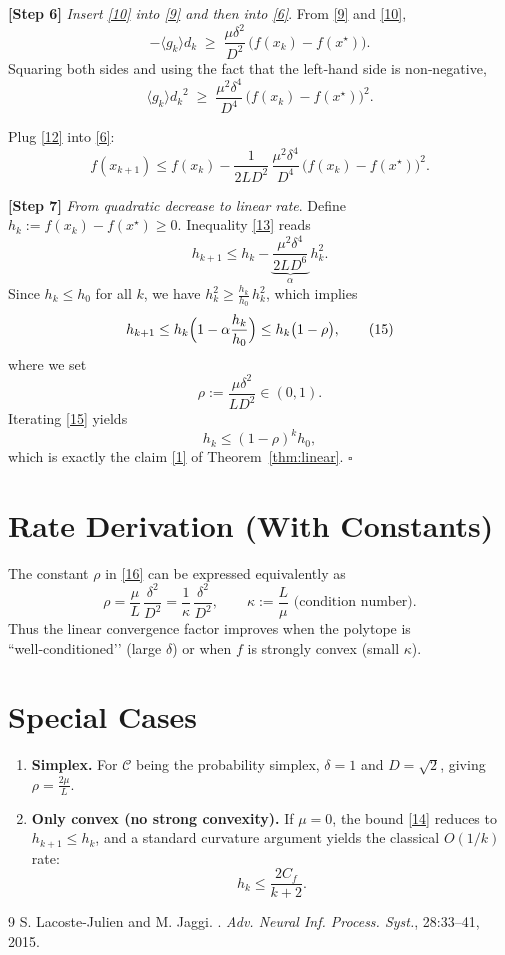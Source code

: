 \documentclass{article}
\newcommand{\Cset}{\mathcal{C}}
\newcommand{\inner}[1]{\langle #1\rangle}
\begin{document}
\noindent\textbf{[Step 6]} \emph{Insert \eqref{10} into \eqref{9} and then into \eqref{6}}.  
From \eqref{9} and \eqref{10},
\[
-\inner{g_{k}}{d_{k}}\;\ge\;
\frac{\mu\delta^{2}}{D^{2}}\,
\bigl(f(x_{k})-f(x^{\star})\bigr).
\tag{11}
\]
Squaring both sides and using the fact that the left‑hand side is non‑negative,
\[
\inner{g_{k}}{d_{k}}^{2}
\;\ge\;
\frac{\mu^{2}\delta^{4}}{D^{4}}\,
\bigl(f(x_{k})-f(x^{\star})\bigr)^{2}.
\tag{12}
\]

Plug \eqref{12} into \eqref{6}:
\[
f(x_{k+1})
\le f(x_{k})
-\frac{1}{2L D^{2}}\,
\frac{\mu^{2}\delta^{4}}{D^{4}}\,
\bigl(f(x_{k})-f(x^{\star})\bigr)^{2}.
\tag{13}
\]

\noindent\textbf{[Step 7]} \emph{From quadratic decrease to linear rate}.  
Define $h_{k}:=f(x_{k})-f(x^{\star})\ge0$.  Inequality \eqref{13} reads
\[
h_{k+1}\le h_{k}
-\underbrace{\frac{\mu^{2}\delta^{4}}{2L D^{6}}}_{\displaystyle\alpha}\,
h_{k}^{2}.
\tag{14}
\]
Since $h_{k}\le h_{0}$ for all $k$, we have $h_{k}^{2}\ge \frac{h_{k}}{h_{0}}\,h_{k}^{2}$,
which implies
\[
h_{k+1}\le h_{k}\Bigl(1-\alpha\frac{h_{k}}{h_{0}}\Bigr)
\le h_{k}\bigl(1-\rho\bigr),
\tag{15}
\]
where we set
\[
\rho:=\frac{\mu\delta^{2}}{L D^{2}}\in(0,1).
\tag{16}
\]
Iterating \eqref{15} yields
\[
h_{k}\le (1-\rho)^{k}h_{0},
\]
which is exactly the claim \eqref{1} of Theorem~\ref{thm:linear}. \hfill $\square$

\section*{Rate Derivation (With Constants)}
The constant $\rho$ in \eqref{16} can be expressed equivalently as
\[
\rho = \frac{\mu}{L}\,\frac{\delta^{2}}{D^{2}}
= \frac{1}{\kappa}\,\frac{\delta^{2}}{D^{2}},
\qquad
\kappa:=\frac{L}{\mu}
\text{ (condition number).}
\]
Thus the linear convergence factor improves when the polytope is ``well‑conditioned’’
(large $\delta$) or when $f$ is strongly convex (small $\kappa$).

\section*{Special Cases}
\begin{enumerate}
\item \textbf{Simplex.} For $\Cset$ being the probability simplex,
$\delta=1$ and $D=\sqrt{2}$, giving $\rho=\frac{2\mu}{L}$.
\item \textbf{Only convex (no strong convexity).} If $\mu=0$, the bound \eqref{14}
reduces to $h_{k+1}\le h_{k}$, and a standard curvature argument yields the classical
$O(1/k)$ rate:
\[
h_{k}\le \frac{2C_{f}}{k+2}.
\]
\end{enumerate}

\begin{thebibliography}{9}
S. Lacoste-Julien and M. Jaggi.
.
\newblock \emph{Adv. Neural Inf. Process. Syst.}, 28:33--41, 2015.
\end{thebibliography}
\end{document}
